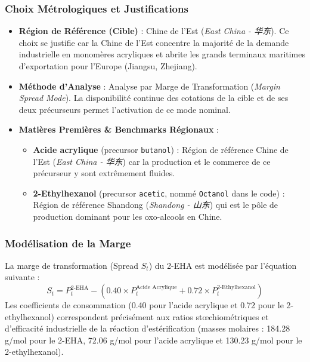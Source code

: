 \documentclass[12pt,a4paper]{article}
\begin{document}
\subsubsection{Choix Métrologiques et Justifications}
\begin{itemize}
    \item \textbf{Région de Référence (Cible)} : Chine de l'Est (\textit{East China - 华东}). Ce choix se justifie car la Chine de l'Est concentre la majorité de la demande industrielle en monomères acryliques et abrite les grands terminaux maritimes d'exportation pour l'Europe (Jiangsu, Zhejiang).
    \item \textbf{Méthode d'Analyse} : Analyse par Marge de Transformation (\textit{Margin Spread Mode}). La disponibilité continue des cotations de la cible et de ses deux précurseurs permet l'activation de ce mode nominal.
    \item \textbf{Matières Premières \& Benchmarks Régionaux} :
    \begin{itemize}
        \item \textbf{Acide acrylique} (precursor \texttt{butanol}) : Région de référence Chine de l'Est (\textit{East China - 华东}) car la production et le commerce de ce précurseur y sont extrêmement fluides.
        \item \textbf{2-Ethylhexanol} (precursor \texttt{acetic}, nommé \texttt{Octanol} dans le code) : Région de référence Shandong (\textit{Shandong - 山东}) qui est le pôle de production dominant pour les oxo-alcools en Chine.
    \end{itemize}
\end{itemize}

\subsubsection{Modélisation de la Marge}
La marge de transformation (Spread $S_t$) du 2-EHA est modélisée par l'équation suivante :
\begin{equation}
S_t = P^{\text{2-EHA}}_t - \left( 0.40 \times P^{\text{Acide Acrylique}}_t + 0.72 \times P^{\text{2-Ethylhexanol}}_t \right)
\end{equation}
Les coefficients de consommation (0.40 pour l'acide acrylique et 0.72 pour le 2-ethylhexanol) correspondent précisément aux ratios stœchiométriques et d'efficacité industrielle de la réaction d'estérification (masses molaires : 184.28 g/mol pour le 2-EHA, 72.06 g/mol pour l'acide acrylique et 130.23 g/mol pour le 2-ethylhexanol).
\end{document}
